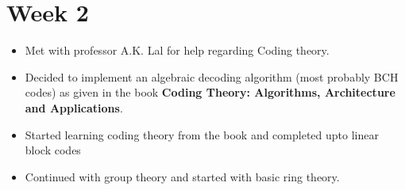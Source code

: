 \section{Week 2}
\begin{itemize}
    \item Met with professor A.K. Lal for help regarding Coding theory.
    \item Decided to implement an algebraic decoding algorithm (most probably BCH codes) as given in the book \textbf{Coding Theory: Algorithms, Architecture and Applications}.
    \item Started learning coding theory from the book and completed upto linear block codes
    \item Continued with group theory and started with basic ring theory.
\end{itemize}